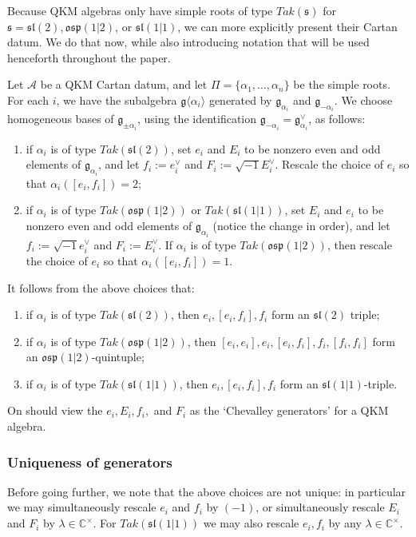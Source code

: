 \documentclass[12pt, a4paper, reqno]{amsart}
\def\C{\mathbb{C}}
\def\AA{\mathcal{A}}
\def\p{\mathfrak{p}}
\def\g{\mathfrak{g}}
\def\l{\mathfrak{l}}
\def\s{\mathfrak{s}}
\def\o{\mathfrak{o}}
\theoremstyle{definition}
\theoremstyle{definition}
\theoremstyle{definition}
\numberwithin{theorem}{section}
\numberwithin{lemma}{section}
\numberwithin{remark}{section}
\numberwithin{definition}{section}
\numberwithin{corollary}{section}
\numberwithin{proposition}{section}
\numberwithin{example}{section}
\begin{document}
	Because QKM algebras only have simple roots of type $Tak(\s)$ for $\s=\s\l(2),\o\s\p(1|2)$, or $\s\l(1|1)$, we can more explicitly present their Cartan datum.  We do that now, while also introducing notation that will be used henceforth throughout the paper.
	
	Let $\AA$ be a QKM Cartan datum, and let $\Pi=\{\alpha_1,\dots,\alpha_n\}$ be the simple roots.  For each $i$, we have the subalgebra $\g\langle\alpha_i\rangle$ generated by $\g_{\alpha_i}$ and $\g_{-\alpha_i}$.  We choose homogeneous bases of $\g_{\pm\alpha_i}$, using the identification $\g_{-\alpha_i}=\g_{\alpha_i}^\vee$, as follows:
	\begin{enumerate}
		\item if $\alpha_i$ is of type $Tak(\s\l(2))$, set $e_i$ and $E_i$ to be nonzero even and odd elements of $\g_{\alpha_i}$, and let $f_i:=e_i^\vee$ and $F_i:=\sqrt{-1}E_i^\vee$.  Rescale the choice of $e_i$ so that $\alpha_i([e_i,f_i])=2$;
		\item if $\alpha_i$ is of type $Tak(\o\s\p(1|2))$ or $Tak(\s\l(1|1))$, set $E_i$ and $e_i$ to be nonzero even and odd elements of $\g_{\alpha_i}$ (notice the change in order), and let $f_i:=\sqrt{-1}e_i^\vee$ and $F_i:=E_i^\vee$.  If $\alpha_i$ is of type $Tak(\o\s\p(1|2))$, then rescale the choice of $e_i$ so that $\alpha_i([e_i,f_i])=1$.
	\end{enumerate}
	It follows from the above choices that:
	\begin{enumerate}
		\item if $\alpha_i$ is of type $Tak(\s\l(2))$, then $e_i,[e_i,f_i],f_i$ form an $\s\l(2)$ triple;
		\item if $\alpha_i$ is of type $Tak(\o\s\p(1|2))$, then $[e_i,e_i],e_i,[e_i,f_i],f_i,[f_i,f_i]$ form an $\o\s\p(1|2)$-quintuple;
		\item if $\alpha_i$ is of type $Tak(\s\l(1|1))$, then $e_i,[e_i,f_i],f_i$ form an $\s\l(1|1)$-triple.
	\end{enumerate}
	On should view the $e_i,E_i,f_i,$ and $F_i$ as the `Chevalley generators' for a QKM algebra.
	
	\subsubsection{Uniqueness of generators}\label{section_uniqueness_gens} Before going further, we note that the above choices are not unique: in particular we may simultaneously rescale $e_i$ and $f_i$ by $(-1)$, or simultaneously rescale $E_i$ and $F_i$ by $\lambda\in\C^\times$. For $Tak(\s\l(1|1))$ we may also rescale $e_i,f_i$ by any $\lambda\in\C^\times$.
	
\end{document}
